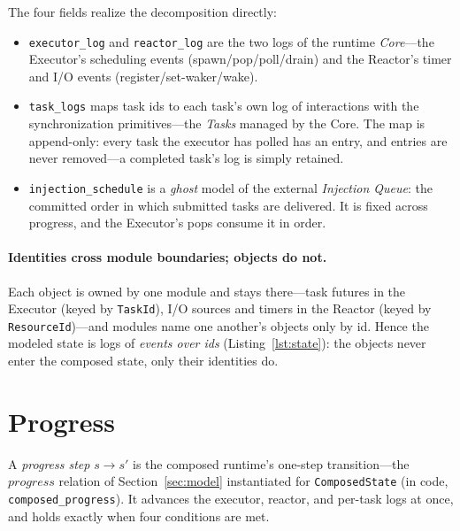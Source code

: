 \documentclass[11pt]{article}
\theoremstyle{plain}
\theoremstyle{definition}
\begin{document}
The four fields realize the decomposition directly:
\begin{itemize}
  \item \lstinline|executor_log| and \lstinline|reactor_log| are the two logs of the
    runtime \emph{Core}---the Executor's scheduling events (spawn/pop/poll/drain) and
    the Reactor's timer and I/O events (register/set-waker/wake).
  \item \lstinline|task_logs| maps task ids to each task's own log of
    interactions with the synchronization primitives---the \emph{Tasks} managed by
    the Core. The map is append-only: every task the executor has polled has an
    entry, and entries are never removed---a completed task's log is simply
    retained.
  \item \lstinline|injection_schedule| is a \emph{ghost} model of the external
    \emph{Injection Queue}: the committed order in which submitted tasks are
    delivered. It is fixed across progress, and the Executor's pops consume it in
    order.
\end{itemize}

\paragraph{Identities cross module boundaries; objects do not.}
Each object is owned by one module and stays there---task futures in the Executor
(keyed by \lstinline|TaskId|), I/O sources and timers in the Reactor (keyed by
\lstinline|ResourceId|)---and modules name one another's objects only by id. Hence
the modeled state is logs of \emph{events over ids} (Listing~\ref{lst:state}): the
objects never enter the composed state, only their identities do.

\section{Progress}
\label{sec:progress}

A \emph{progress step} $s \to s'$ is the composed runtime's one-step transition---the
$\mathit{progress}$ relation of Section~\ref{sec:model} instantiated for
\lstinline|ComposedState| (in code, \lstinline|composed_progress|). It advances the
executor, reactor, and per-task logs at once, and holds exactly when four conditions are
met.
\end{document}

